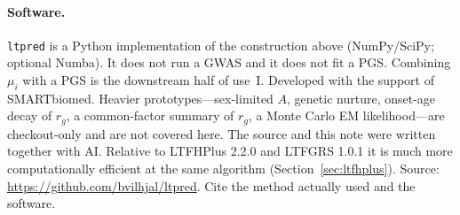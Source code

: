 \documentclass[11pt,a4paper]{article}
\begin{document}
\paragraph{Software.}
\texttt{ltpred} is a Python implementation of the construction
above (NumPy/SciPy; optional Numba).
It does not run a GWAS and it does not fit a PGS.
Combining $\mu_i$ with a PGS is the downstream half of use~I.
Developed with the support of SMARTbiomed.
Heavier prototypes---sex-limited $A$, genetic nurture, onset-age
decay of $r_g$, a common-factor summary of $r_g$, a Monte Carlo EM
likelihood---are checkout-only and are not covered here.
The source and this note were written together with AI.
Relative to LTFHPlus 2.2.0 and LTFGRS 1.0.1 it is much more
computationally efficient at the same algorithm
(Section~\ref{sec:ltfhplus}).
Source: \url{https://github.com/bvilhjal/ltpred}.
Cite the method actually used
\cite{hujoel2020,pedersen2022,pedersen2023,krebs2024} and the
software.
\end{document}
